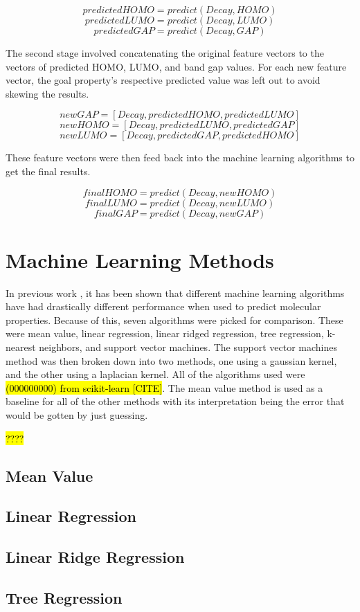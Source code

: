 \documentclass[10pt]{article}
\begin{document}
$$ predictedHOMO = predict(Decay, HOMO) $$
$$ predictedLUMO = predict(Decay, LUMO) $$
$$ predictedGAP = predict(Decay, GAP) $$

The second stage involved concatenating the original feature vectors to the vectors of predicted HOMO, LUMO, and band gap values. For each new feature vector, the goal property's respective predicted value was left out to avoid skewing the results.

$$ newGAP = [Decay, predictedHOMO, predictedLUMO] $$
$$ newHOMO = [Decay, predictedLUMO, predictedGAP] $$
$$ newLUMO = [Decay, predictedGAP, predictedHOMO] $$

These feature vectors were then feed back into the machine learning algorithms to get the final results.

$$ finalHOMO = predict(Decay, newHOMO) $$
$$ finalLUMO = predict(Decay, newLUMO) $$
$$ finalGAP = predict(Decay, newGAP) $$

\section{Machine Learning Methods}

In previous work \cite{montavon_machine_2013}, it has been shown that different machine learning algorithms have had drastically different performance when used to predict molecular properties. Because of this, seven algorithms were picked for comparison. These were mean value, linear regression, linear ridged regression, tree regression, k-nearest neighbors, and support vector machines. The support vector machines method was then broken down into two methods, one using a gaussian kernel, and the other using a laplacian kernel. All of the algorithms used were \hl{(000000000) from scikit-learn [CITE]}. The mean value method is used as a baseline for all of the other methods with its interpretation being the error that would be gotten by just guessing.


\hl{????}
\subsection{Mean Value}
\subsection{Linear Regression}
\subsection{Linear Ridge Regression}
\subsection{Tree Regression}
\end{document}
